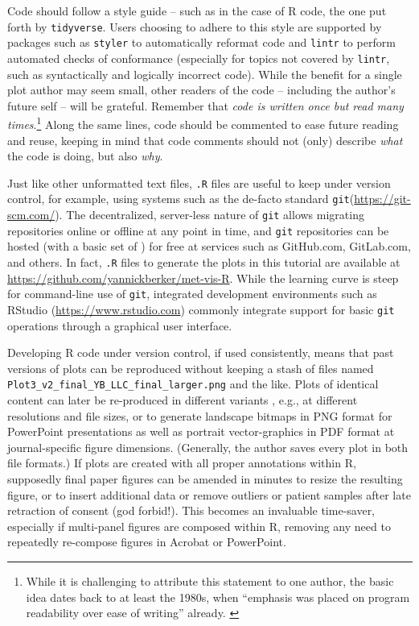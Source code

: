 \documentclass[AMA,LATO1COL]{WileyNJD-v2}
\begin{document}
Code should follow a style guide -- such as in the case of R code, the one put
forth by \texttt{tidyverse}. \cite{tidyverse_style} Users choosing to adhere to
this style are supported by packages such as \texttt{styler} \cite{styler} to
automatically reformat code and \texttt{lintr} \cite{lintr} to perform automated
checks of conformance (especially for topics not covered by \texttt{lintr}, such
as syntactically and logically incorrect code). While the benefit for a single
plot author may seem small, other readers of the code -- including the author's
future self -- will be grateful. Remember that \textit{code is written once but
read many times}.\footnote{While it is challenging to attribute this statement
to one author, the basic idea dates back to at least the 1980s, when ``emphasis
was placed on program readability over ease of writing'' already. \cite{ada83}}
Along the same lines, code should be commented to ease future reading and reuse,
keeping in mind that code comments should not (only) describe \textit{what} the
code is doing, but also \textit{why}.

Just like other unformatted text files, \texttt{.R} files are useful to keep
under version control, for example, using systems such as the de-facto standard
\texttt{git}(\url{https://git-scm.com/}). The decentralized, server-less nature
of \texttt{git} allows migrating repositories online or offline at any point in
time, and \texttt{git} repositories can be hosted (with a basic set of
) for free at services such as GitHub.com, GitLab.com, and
others. In fact, \texttt{.R} files to generate the plots in this tutorial are
available at \url{https://github.com/yannickberker/met-vis-R}. While the
learning curve is steep for command-line use of \texttt{git}, integrated
development environments such as RStudio (\url{https://www.rstudio.com})
commonly integrate support for basic \texttt{git} operations through a graphical
user interface.

Developing R code under version control, if used consistently, means that past
versions of plots can be reproduced without keeping a stash of files named
\verb|Plot3_v2_final_YB_LLC_final_larger.png| and the like. Plots of identical
content can later be re-produced in different variants , e.g., at different resolutions and file sizes, or to generate
landscape bitmaps in PNG format for PowerPoint presentations as well as portrait
vector-graphics in PDF format at journal-specific figure dimensions. (Generally,
the author saves every plot in both file formats.) If plots are created with all
proper annotations within R, supposedly final paper figures can be amended in
minutes to resize the resulting figure, or to insert additional data or remove
outliers or patient samples after late retraction of consent (god forbid!). This
becomes an invaluable time-saver, especially if multi-panel figures are composed
within R, removing any need to repeatedly re-compose figures in Acrobat or
PowerPoint.
\end{document}
